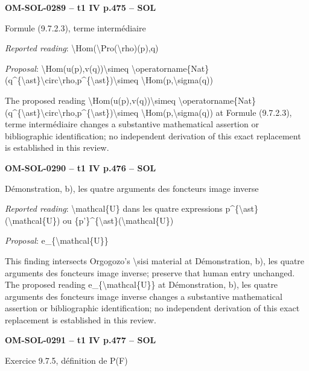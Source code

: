 \par\noindent\textbf{OM-SOL-0289 -- t1 IV p.475 -- SOL}\par
Formule (9.7.2.3), terme intermédiaire\par
\emph{Reported reading}: \textbackslash{}Hom(\textbackslash{}Pro(\textbackslash{}rho)(p),q)\par
\emph{Proposal}: \textbackslash{}Hom(u(p),v(q))\textbackslash{}simeq \textbackslash{}operatorname\{Nat\}(q\textasciicircum{}\{\textbackslash{}ast\}\textbackslash{}circ\textbackslash{}rho,p\textasciicircum{}\{\textbackslash{}ast\})\textbackslash{}simeq \textbackslash{}Hom(p,\textbackslash{}sigma(q))\par
The proposed reading \textbackslash{}Hom(u(p),v(q))\textbackslash{}simeq \textbackslash{}operatorname\{Nat\}(q\textasciicircum{}\{\textbackslash{}ast\}\textbackslash{}circ\textbackslash{}rho,p\textasciicircum{}\{\textbackslash{}ast\})\textbackslash{}simeq \textbackslash{}Hom(p,\textbackslash{}sigma(q)) at Formule (9.7.2.3), terme intermédiaire changes a substantive mathematical assertion or bibliographic identification; no independent derivation of this exact replacement is established in this review.\par
\par\noindent\textbf{OM-SOL-0290 -- t1 IV p.476 -- SOL}\par
Démonstration, b), les quatre arguments des foncteurs image inverse\par
\emph{Reported reading}: \textbackslash{}mathcal\{U\} dans les quatre expressions p\textasciicircum{}\{\textbackslash{}ast\}(\textbackslash{}mathcal\{U\}) ou \{p'\}\textasciicircum{}\{\textbackslash{}ast\}(\textbackslash{}mathcal\{U\})\par
\emph{Proposal}: e\_\{\textbackslash{}mathcal\{U\}\}\par
This finding intersects Orgogozo's \textbackslash{}sisi material at Démonstration, b), les quatre arguments des foncteurs image inverse; preserve that human entry unchanged. The proposed reading e\_\{\textbackslash{}mathcal\{U\}\} at Démonstration, b), les quatre arguments des foncteurs image inverse changes a substantive mathematical assertion or bibliographic identification; no independent derivation of this exact replacement is established in this review.\par
\par\noindent\textbf{OM-SOL-0291 -- t1 IV p.477 -- SOL}\par
Exercice 9.7.5, définition de P(F)\par
